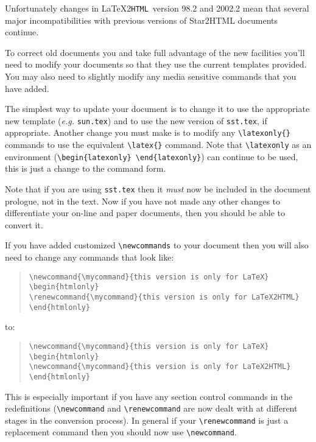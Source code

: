 \documentclass[twoside,11pt]{article}
\newenvironment{latexonly}{}{}
\newcommand{\latex}[1]{#1}
\newcommand{\latextohtml}{\LaTeX2\texttt{HTML}}
\renewcommand{\_}{\texttt{\symbol{95}}}
\begin{document}
Unfortunately changes in \latextohtml\ version 98.2 and 2002.2 
mean that several major incompatibilities with previous versions
of Star2HTML documents continue. 

To correct old documents you and take full advantage of the new facilities
you'll need to modify your documents so that they use the current templates
provided. You may also need to slightly modify any media sensitive commands
that you have added.

The simplest way to update your document is to change it to use the
appropriate new template (\textit{e.g.} \verb#sun.tex#) and to use the
new version of \verb#sst.tex#, if appropriate. Another change you must
make is to modify any \verb#\latexonly{}# commands to use the
equivalent \verb#\latex{}# command. Note that \verb#\latexonly# as an
environment (\verb#\begin{latexonly} \end{latexonly}#) can continue to be
used, this is just a change to the command form.

Note that if you are using \verb#sst.tex# then it \emph{must} now be
included in the document prologue, not in the text. Now if you have
not made any other changes to differentiate your on-line and paper
documents, then you should be able to convert it.

If you have added customized \verb#\newcommands# to your document then
you will also need to change any commands that look like:
\begin{quote}
\verb!\newcommand{\mycommand}{this version is only for LaTeX}!\\
\verb!\begin!\verb!{htmlonly}!\\
\enspace\enspace\hspace*{2em}\verb!\renewcommand{\mycommand}{this version is only for LaTeX2HTML}!\\
\verb!\end!\verb!{htmlonly}!
\end{quote}
to:
\begin{quote}
\verb!\newcommand{\mycommand}{this version is only for LaTeX}!\\
\verb!\begin!\verb!{htmlonly}!\\
\enspace\enspace\hspace*{2em}\verb!\newcommand{\mycommand}{this version is only for LaTeX2HTML}!\\
\verb!\end!\verb!{htmlonly}!
\end{quote}
This is especially important if you have any section control commands
in the redefinitions (\verb#\newcommand# and \verb#\renewcommand# are
now dealt with at different stages in the conversion process). In
general if your \verb#\renewcommand# is just a replacement command then
you should now use \verb#\newcommand#.
\end{document}
